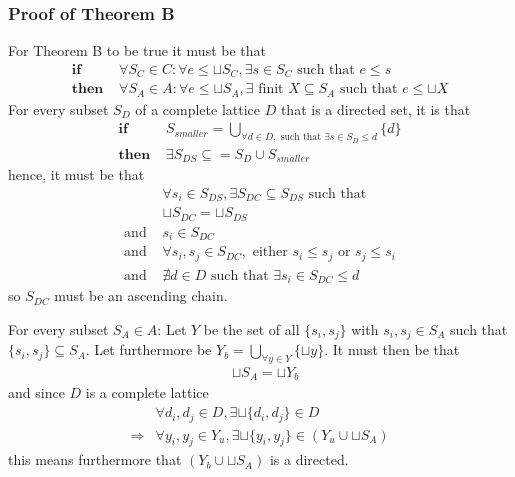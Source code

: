 \subsubsection{Proof of Theorem B}
For Theorem B to be true it must be that
\begin{align}
	\textbf{if }		& \forall S_C \in C: \forall e \leq \sqcup S_C,																	\label{eq:cola:pt2:st}
										\exists s \in S_C \text{ such that } e \leq s \\
	\textbf{then }	& \forall S_A \in A: \forall e \leq \sqcup S_A,
										\exists \text{ finit } X \subseteq S_A \text{ such that } e \leq \sqcup X			\label{eq:cola:pt2:en}
\end{align}
For every subset $S_D$ of a complete lattice $D$ that is a directed set, it is that
\begin{align}
\textbf{if }		& S_{smaller} = \bigcup_{\forall d \in D, \text{ such that } \exists s \in S_D \leq d} \{ d\} \\
\textbf{then }	& \exists S_{DS} \subseteq = S_D \cup S_{smaller}
\end{align}
hence, it must be that
\begin{align}
						& \forall s_i \in S_{DS}, \exists S_{DC} \subseteq S_{DS} \text{ such that } \\
						&	\sqcup S_{DC} = \sqcup S_{DS} \\
\text{and } & s_i \in S_{DC} \\
\text{and } & \forall s_i,s_j \in S_{DC}, \text{ either } s_i \leq s_j \text{ or } s_j \leq s_i \\
\text{and }	& \nexists d \in D \text{ such that } \exists s_i \in S_{DC} \leq d
\end{align}
so $S_{DC}$ must be an ascending chain. 

For every subset $S_A \in A$: Let $Y$ be the set of all $\{s_i,s_j\}$ with $s_i,s_j \in S_A$ such that $ \{s_i,s_j\} \subseteq S_A$. Let furthermore be $Y_b = \bigcup_{\forall y \in Y} \{\sqcup y\}$. It must then be that
\begin{align}
						& \sqcup S_A = \sqcup Y_b
\end{align}
and since $D$ is a complete lattice
\begin{align}
						& \forall d_i,d_j \in D, \exists \sqcup \{d_i,d_j\} \in D \\
\Rightarrow	&	\forall y_i,y_j \in Y_u, \exists \sqcup \{y_i,y_j\} \in (Y_u \cup \sqcup S_A)
\end{align}
this means furthermore that $(Y_b \cup \sqcup S_A)$ is a directed. 

